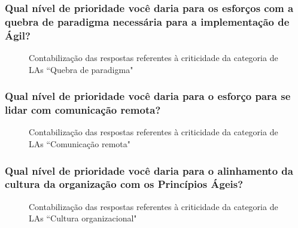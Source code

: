 \subsubsection{Qual nível de prioridade você daria para os esforços com a quebra de paradigma necessária para a implementação de Ágil?}

\begin{figure}[H]
	\centering
	\captionsetup{justification=centering}
	\caption{Contabilização das respostas referentes à criticidade da categoria de LAs ``Quebra de paradigma"}
	\label{fig:result-paradigma}
\end{figure}

\subsubsection{Qual nível de prioridade você daria para o esforço para se lidar com comunicação remota?}

\begin{figure}[H]
	\centering
	\captionsetup{justification=centering}
	\caption{Contabilização das respostas referentes à criticidade da categoria de LAs ``Comunicação remota"}
	\label{fig:result-remota}
\end{figure}

\subsubsection{Qual nível de prioridade você daria para o alinhamento da cultura da organização com os Princípios Ágeis?}

\begin{figure}[H]
	\centering
	\captionsetup{justification=centering}
	\caption{Contabilização das respostas referentes à criticidade da categoria de LAs ``Cultura organizacional"}
	\label{fig:result-cultura}
\end{figure}

